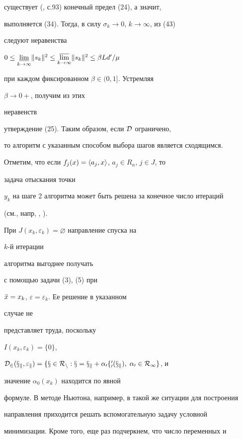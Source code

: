 существует (\cite{Vas}, с.93) конечный предел (24), а значит,


выполняется (34). Тогда, в силу $\sigma_k\to 0$, $k\to\infty$, из (43)


следуют неравенства


$0\le\underset{k\to\infty}{\varliminf}{}\|s_k\|^2\le


\underset{k\to\infty}{\varlimsup}{}\|s_k\|^2\le\beta Ld'/\mu$


при каждом фиксированном $\beta\in(0,1]$. Устремляя


$\beta\to 0+$, получим из этих


неравенств


утверждение (25). Таким образом, если $\cal D$ ограничено,


то алгоритм с указанным способом выбора шагов является сходящимся.





Отметим, что если $f_j(x)=\langle a_j,x\rangle$, $a_j\in R_n$, $j\in J$, то


задача отыскания точки


$y_k$ на шаге 2 алгоритма может быть решена за конечное число итераций


(см., напр, \cite{Ps}, \cite{Su}).





При $J(x_k,\varepsilon_k)=\varnothing$ направление спуска на


$k$-й итерации


алгоритма выгоднее получать


с помощью задачи (3), (5) при


$\Bar x=x_k$, $\varepsilon=\varepsilon_k$. Ее решение в указанном


случае не


представляет труда, поскольку


$I(x_k,\varepsilon_k)=\{0\}$,


$\cal D_2(x_k,\varepsilon_k)=\{x\in R_n:x=x_k+\alpha_0f'_0(x_k),\;


\alpha_0\in R_1\}$, и


значение $\alpha_0(x_k)$ находится по явной


формуле. В методе Ньютона, например, в такой же ситуации для построения


направления приходится решать вспомогательную задачу условной


минимизации. Кроме того, еще раз подчеркнем, что число переменных и


